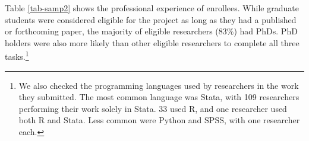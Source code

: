 \documentclass[
  letterpaper,
  DIV=11,
  numbers=noendperiod]{scrartcl}
\begin{document}
\begin{table}[!htbp] \centering \renewcommand*{\arraystretch}{1.1}\caption{Researcher Recruitment Source and Completion Confidence}
\end{table}

Table \ref{tab-samp2} shows the professional experience of enrollees.
While graduate students were considered eligible for the project as long
as they had a published or forthcoming paper, the majority of eligible
researchers (83\%) had PhDs. PhD holders were also more likely than
other eligible researchers to complete all three tasks.\footnote{We also
  checked the programming languages used by researchers in the work they
  submitted. The most common language was Stata, with 109 researchers
  performing their work solely in Stata. 33 used R, and one researcher
  used both R and Stata. Less common were Python and SPSS, with one
  researcher each.}
\end{document}
